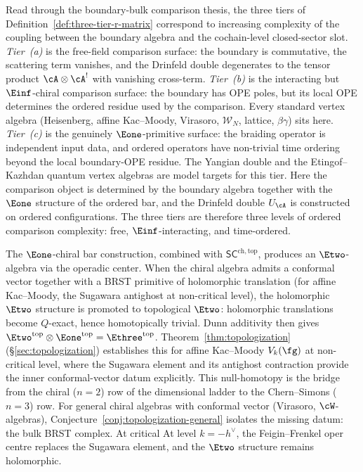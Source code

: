 \begin{remark}
\label{rem:three-tier-boundary-bulk}
%
%
Read through the boundary-bulk comparison thesis, the three
tiers of Definition~\ref{def:three-tier-r-matrix} correspond to
increasing complexity of the coupling between the boundary algebra
and the cochain-level closed-sector slot.
\emph{Tier~(a)} is the free-field comparison surface: the boundary is
commutative, the scattering term vanishes, and the Drinfeld double
degenerates to the tensor product $\cA \otimes \cA^!$ with vanishing
cross-term.
\emph{Tier~(b)} is the interacting but $\Einf$-chiral comparison
surface: the boundary has OPE poles, but its local OPE determines the
ordered residue used by the comparison. Every standard vertex algebra
(Heisenberg, affine Kac--Moody, Virasoro, $\mathcal{W}_N$, lattice,
$\beta\gamma$) sits here.
\emph{Tier~(c)} is the genuinely $\Eone$-primitive surface: the
braiding operator is independent input data, and ordered operators have
non-trivial time ordering beyond the local boundary-OPE residue. The
Yangian double and the Etingof--Kazhdan quantum vertex algebras
are model targets for this tier. Here the comparison object is
determined by the boundary algebra together with the $\Eone$ structure
of the ordered bar, and the Drinfeld
double $U_\cA$ is constructed on ordered configurations.
The three tiers are therefore three levels of ordered comparison
complexity: free, $\Einf$-interacting, and time-ordered.
\end{remark}

\begin{remark}
\label{rem:topologization-intro}
%
The $\Eone$-chiral bar construction, combined with
$\mathsf{SC}^{\mathrm{ch,top}}$, produces an $\Etwo$-algebra
via the operadic center. When the chiral algebra admits a
conformal vector together with a BRST primitive of holomorphic
translation (for affine Kac--Moody, the Sugawara antighost at
non-critical level), the holomorphic $\Etwo$ structure is promoted to
topological $\Etwo$: holomorphic translations become $Q$-exact,
hence homotopically trivial. Dunn additivity then gives
$\Etwo^{\mathrm{top}} \otimes \Eone^{\mathrm{top}} =
\Ethree^{\mathrm{top}}$.
Theorem~\ref{thm:topologization}
(\S\ref{sec:topologization}) establishes this for affine
Kac--Moody $V_k(\fg)$ at non-critical level, where the
Sugawara element and its antighost contraction provide the
inner conformal-vector datum explicitly. This null-homotopy is the bridge from the
chiral ($n = 2$) row of the dimensional ladder to the
Chern--Simons ($n = 3$) row. For general chiral algebras
with conformal vector (Virasoro, $\cW$-algebras),
Conjecture~\ref{conj:topologization-general} isolates the
missing datum: the bulk BRST complex. At critical
At level $k = -h^\vee$, the Feigin--Frenkel oper centre replaces the
Sugawara element, and the $\Etwo$ structure remains holomorphic.
\end{remark}


